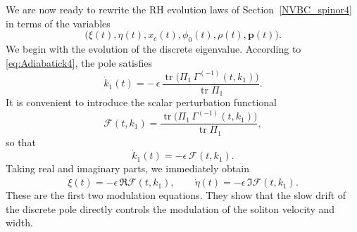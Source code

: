 \documentclass[11pt]{amsart}
\theoremstyle{definition}
\numberwithin{equation}{section}
\begin{document}
We are now ready to rewrite the RH evolution laws of Section~\ref{NVBC_spinor4} in terms of the variables
\[
\bigl(\xi(t),\eta(t),x_c(t),\phi_0(t),\rho(t),\mathbf p(t)\bigr).
\]
We begin with the evolution of the discrete eigenvalue. According to \eqref{eq:Adiabatick4}, the pole satisfies
\begin{equation}
\dot{k}_1(t) = -\,\epsilon\,\frac{\operatorname{tr}\bigl(\Pi_1\,\Gamma^{(-1)}(t,k_1)\bigr)}{\operatorname{tr}\Pi_1}.
\label{eq:kdotabstract5}
\end{equation}
It is convenient to introduce the scalar perturbation functional
\begin{equation}
\mathcal{F}(t,k_1)
=
\frac{\operatorname{tr}\bigl(\Pi_1\,\Gamma^{(-1)}(t,k_1)\bigr)}{\operatorname{tr}\Pi_1},
\label{eq:Fdef5}
\end{equation}
so that
\begin{equation}
\dot{k}_1(t)=-\epsilon\,\mathcal{F}(t,k_1).
\label{eq:kdotF5}
\end{equation}
Taking real and imaginary parts, we immediately obtain
\begin{equation}
\dot{\xi}(t)=-\epsilon\,\Re \mathcal{F}(t,k_1),
\qquad
\dot{\eta}(t)=-\epsilon\,\Im \mathcal{F}(t,k_1).
\label{eq:xietadot5}
\end{equation}
These are the first two modulation equations. They show that the slow drift of the discrete pole directly controls the modulation of the soliton velocity and width.
\end{document}
